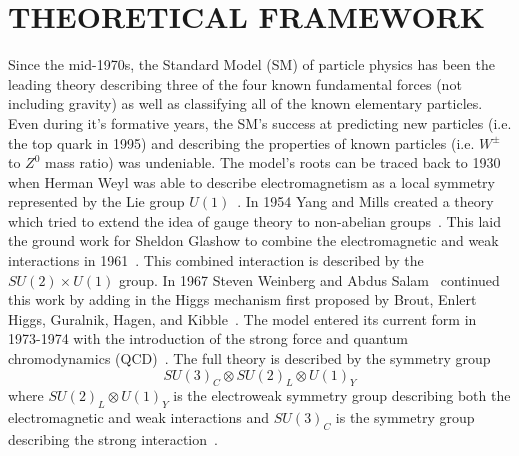 %
%
%


\chapter{\uppercase {Theoretical Framework}}
\label{ch:theoretical_framework}

Since the mid-1970s, the Standard Model (SM) of particle physics has been the leading theory describing three of the four known fundamental forces (not including gravity) as well as classifying all of the known elementary particles.
Even during it's formative years, the SM's success at predicting new particles (i.e. the top quark in 1995) and describing the properties of known particles (i.e. $W^{\pm}$ to $Z^{0}$ mass ratio) was undeniable.
The model's roots can be traced back to 1930 when Herman Weyl was able to describe electromagnetism as a local symmetry represented by the Lie group $U\left(1\right)$~\cite{Weyl1929}.
In 1954 Yang and Mills created a theory which tried to extend the idea of gauge theory to non-abelian groups~\cite{PhysRev.96.191}.
This laid the ground work for Sheldon Glashow to combine the electromagnetic and weak interactions in 1961~\cite{GLASHOW1961579}.
This combined interaction is described by the $SU\left(2\right){\times}U\left(1\right)$ group.
In 1967 Steven Weinberg and Abdus Salam~\cite{PhysRevLett.19.1264,salam1968} continued this work by adding in the Higgs mechanism first proposed by Brout, Enlert Higgs, Guralnik, Hagen, and Kibble~\cite{PhysRevLett.13.321,PhysRevLett.13.508,Higgs:1966ev,PhysRevLett.13.585,Kibble:1967sv}.
The model entered its current form in 1973-1974 with the introduction of the strong force and quantum chromodynamics (QCD)~\cite{Neeman:1961jhl,GellMann:1962xb,GellMann:1964nj,Zweig:1981pd,Fritzsch:1972jv}.
The full theory is described by the symmetry group
\begin{equation}\label{eq:standard_model_symmetry_group}
SU\left(3\right)_{C}{\otimes}SU\left(2\right)_{L}{\otimes}U\left(1\right)_{Y}
\end{equation}
where $SU\left(2\right)_{L}{\otimes}U\left(1\right)_{Y}$ is the electroweak symmetry group describing both the electromagnetic and weak interactions and $SU\left(3\right)_{C}$ is the symmetry group describing the strong interaction~\cite{Burgess2007,Aitchison2012}.

